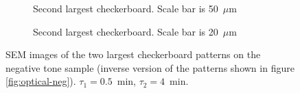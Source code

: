 \begin{figure}[htb]
\begin{subfigure}[t]{0.24\linewidth}
    	\centering
    	\caption{Second largest checkerboard. Scale bar is 50~$\mu$m}
    	\label{fig:b2d28_q28}
    \end{subfigure}
    \hfill
    \begin{subfigure}[t]{0.24\linewidth}
    	\centering
    	\caption{Second largest checkerboard. Scale bar is 20~$\mu$m}
    	\label{fig:b2d29_q29}
    \end{subfigure}
    \caption{SEM images of the two largest checkerboard patterns on the negative tone sample (inverse version of the patterns shown in figure \ref{fig:optical-neg}). $\tau_1 = 0.5$~min, $\tau_2 = 4$~min.}
\end{figure}



